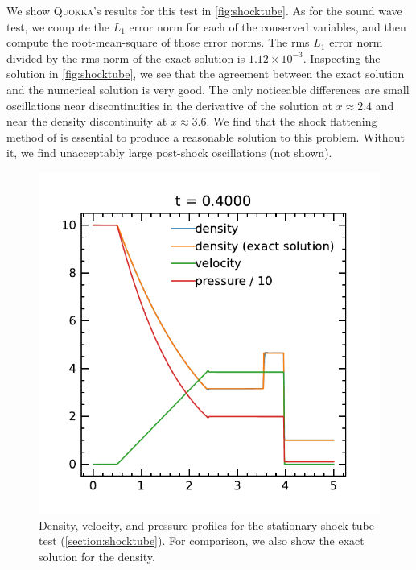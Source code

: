 \documentclass[fleqn,usenatbib]{mnras}
\newcommand{\quokka}{\textsc{Quokka}}
\begin{document}
We show \quokka's results for this test in \autoref{fig:shocktube}. As for the sound wave test, we compute the $L_1$ error norm for each of the conserved variables, and then compute the root-mean-square of those error norms. The rms $L_1$ error norm divided by the rms norm of the exact solution is $1.12 \times 10^{-3}$. Inspecting the solution in \autoref{fig:shocktube}, we see that the agreement between the exact solution and the numerical solution is very good. The only noticeable differences are small oscillations near discontinuities in the derivative of the solution at $x \approx 2.4$ and near the density discontinuity at $x \approx 3.6$. We find that the shock flattening method of \cite{Miller_2002} is essential to produce a reasonable solution to this problem. Without it, we find unacceptably large post-shock oscillations (not shown).
\begin{figure}
    \includegraphics[width=\columnwidth]{hydro_shocktube_0.4000.pdf}
    \caption{Density, velocity, and pressure profiles for the stationary shock tube test (\autoref{section:shocktube}). For comparison, we also show the exact solution for the density.}
    \label{fig:shocktube}
\end{figure}
\end{document}
